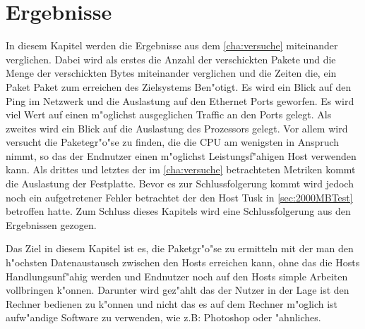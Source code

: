 \chapter{Ergebnisse}
\label{cha:ergebnisse}
In diesem Kapitel werden die Ergebnisse aus dem \cref{cha:versuche} miteinander verglichen. %
Dabei wird als erstes die Anzahl der verschickten Pakete und die Menge der verschickten %
Bytes miteinander verglichen und die Zeiten die, ein Paket Paket zum erreichen des %
Zielsystems Ben"otigt. Es wird ein Blick auf den Ping im Netzwerk und die Auslastung auf den %
Ethernet Ports geworfen. Es wird viel Wert auf einen m"oglichst ausgeglichen %
Traffic an den Ports gelegt. Als zweites wird ein Blick auf die Auslastung des Prozessors gelegt. %
Vor allem wird versucht die Paketegr"o"se zu finden, die die CPU am wenigsten in Anspruch nimmt, %
so das der Endnutzer einen m"oglichst Leistungsf"ahigen Host verwenden kann. Als drittes %
und letztes der im \cref{cha:versuche} betrachteten Metriken kommt die Auslastung der Festplatte. %
Bevor es zur Schlussfolgerung kommt wird jedoch noch ein aufgetretener Fehler betrachtet der den %
Host Tusk in \cref{sec:2000MBTest} betroffen hatte. Zum Schluss dieses Kapitels wird eine Schlussfolgerung %
aus den Ergebnissen gezogen. %

Das Ziel in diesem Kapitel ist es, die Paketgr"o"se zu ermitteln mit der man den h"ochsten Datenaustausch zwischen den %
Hosts erreichen kann, ohne das die Hosts Handlungsunf"ahig werden und Endnutzer noch auf %
den Hosts simple Arbeiten vollbringen k"onnen. Darunter wird gez"ahlt das der Nutzer in der %
Lage ist den Rechner bedienen zu k"onnen und nicht das es auf dem Rechner m"oglich ist aufw"andige Software %
zu verwenden, wie z.B: Photoshop oder "ahnliches.  







